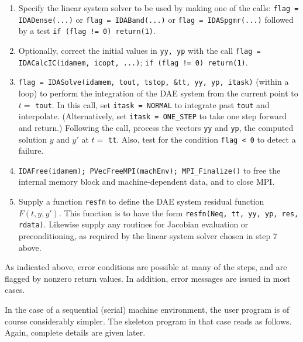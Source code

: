 \documentclass[11pt]{article}
\begin{document}
\begin{enumerate}
\item Specify the linear system solver to be used by making one of the
calls: \newline 
{\tt flag = IDADense(...)} or {\tt flag = IDABand(...)} or
{\tt flag = IDASpgmr(...)} \newline
followed by a test {\tt if (flag != 0) return(1)}.

\item Optionally, correct the initial values in {\tt yy, yp} with 
the call \newline
{\tt flag = IDACalcIC(idamem, icopt, ...)}; {\tt if (flag != 0) return(1)}.

\item {\tt flag = IDASolve(idamem, tout, tstop, \&tt, yy, yp, itask)} 
\newline (within a loop) to perform the integration of the DAE system 
from the current point to $t =$ {\tt tout}.  In this call, set 
{\tt itask = NORMAL} to integrate past {\tt tout} and interpolate.
(Alternatively, set {\tt itask = ONE\_STEP} to take one step forward
and return.)  Following the call, process the vectors {\tt yy} and 
{\tt yp}, the computed solution $y$ and $y'$ at $t = $ {\tt tt}.
Also, test for the condition {\tt flag < 0} to detect a failure.

\item {\tt IDAFree(idamem); PVecFreeMPI(machEnv); MPI\_Finalize()} to
free the internal memory block and machine-dependent data, and 
to close MPI.

\item Supply a function {\tt resfn} to define the DAE system residual 
function $F(t,y,y')$.  This function is to have the form 
{\tt resfn(Neq, tt, yy, yp, res, rdata)}.  Likewise supply any
routines for Jacobian evaluation or preconditioning, as required by
the linear system solver chosen in step 7 above.

\end{enumerate}

\vspace{.1 in}

As indicated above, error conditions are possible at many of the
steps, and are flagged by nonzero return values.  In addition, error
messages are issued in most cases.

In the case of a sequential (serial) machine environment, the user
program is of course considerably simpler.  The skeleton program in
that case reads as follows.  Again, complete details are given later.
\end{document}
